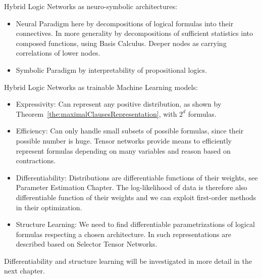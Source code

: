 Hybrid Logic Networks as neuro-symbolic architectures:
\begin{itemize}
	\item Neural Paradigm here by decompositions of logical formulas into their connectives.
		In more generality by decompositions of sufficient statistics into composed functions, using Basis Calculus.
		Deeper nodes as carrying correlations of lower nodes.
	\item Symbolic Paradigm by interpretability of propositional logics.
\end{itemize}


Hybrid Logic Networks as trainable Machine Learning models:
\begin{itemize}
	\item Expressivity: Can represent any positive distribution, as shown by Theorem~\ref{the:maximalClausesRepresentation}, with $2^d$ formulas.
	\item Efficiency: Can only handle small subsets of possible formulas, since their possible number is huge.
		Tensor networks provide means to efficiently represent formulas depending on many variables and reason based on contractions.
	\item Differentiability: Distributions are differentiable functions of their weights, see Parameter Estimation Chapter. 
		The log-likelihood of data is therefore also differentiable function of their weights and we can exploit first-order methods in their optimization.
	\item Structure Learning: We need to find differentiable parametrizations of logical formulas respecting a chosen architecture.
		In  such representations are described based on Selector Tensor Networks.
\end{itemize}
Differentiability and structure learning will be investigated in more detail in the next chapter.





